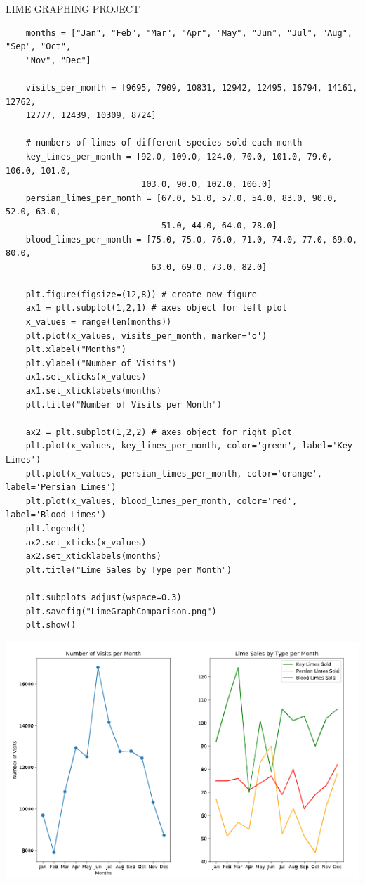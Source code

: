 \documentclass[11pt, a4paper]{article}
\begin{document}
\begin{spacing}{1.1}
	\noindent LIME GRAPHING PROJECT
	\begin{lstlisting}
	months = ["Jan", "Feb", "Mar", "Apr", "May", "Jun", "Jul", "Aug", "Sep", "Oct", 
	"Nov", "Dec"]
	
	visits_per_month = [9695, 7909, 10831, 12942, 12495, 16794, 14161, 12762, 
	12777, 12439, 10309, 8724]
	
	# numbers of limes of different species sold each month
	key_limes_per_month = [92.0, 109.0, 124.0, 70.0, 101.0, 79.0, 106.0, 101.0, 
	                       103.0, 90.0, 102.0, 106.0]
	persian_limes_per_month = [67.0, 51.0, 57.0, 54.0, 83.0, 90.0, 52.0, 63.0, 
	                           51.0, 44.0, 64.0, 78.0]
	blood_limes_per_month = [75.0, 75.0, 76.0, 71.0, 74.0, 77.0, 69.0, 80.0, 
	                         63.0, 69.0, 73.0, 82.0]
	
	plt.figure(figsize=(12,8)) # create new figure
	ax1 = plt.subplot(1,2,1) # axes object for left plot
	x_values = range(len(months))
	plt.plot(x_values, visits_per_month, marker='o')
	plt.xlabel("Months")
	plt.ylabel("Number of Visits")
	ax1.set_xticks(x_values)
	ax1.set_xticklabels(months)
	plt.title("Number of Visits per Month")
	
	ax2 = plt.subplot(1,2,2) # axes object for right plot
	plt.plot(x_values, key_limes_per_month, color='green', label='Key Limes')
	plt.plot(x_values, persian_limes_per_month, color='orange', label='Persian Limes')
	plt.plot(x_values, blood_limes_per_month, color='red', label='Blood Limes')
	plt.legend()
	ax2.set_xticks(x_values)
	ax2.set_xticklabels(months)
	plt.title("Lime Sales by Type per Month")
	
	plt.subplots_adjust(wspace=0.3)
	plt.savefig("LimeGraphComparison.png")
	plt.show() \end{lstlisting}\vspace*{1mm}
	\includegraphics[scale=.95]{lime} \newpage
	

\end{spacing}
\end{document}
